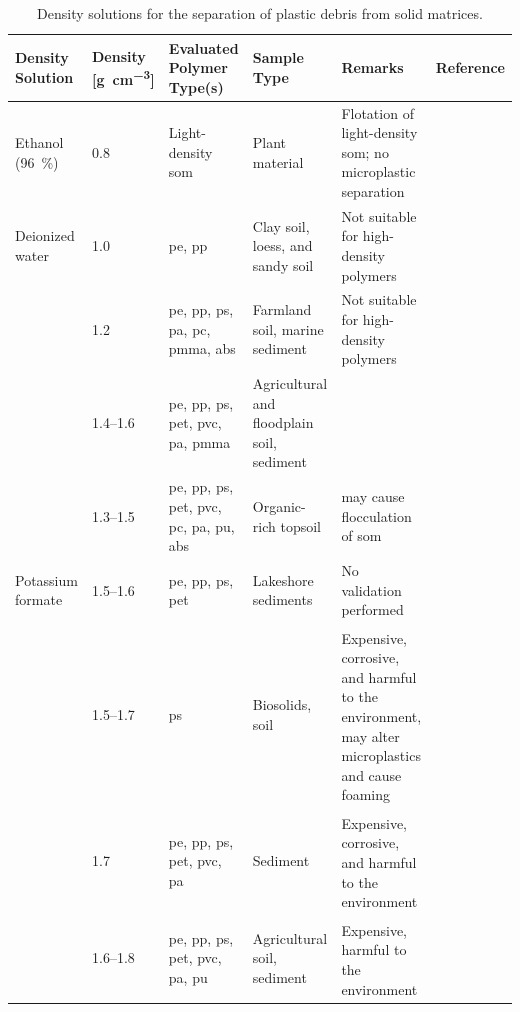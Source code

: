 \begin{table}[t]
	\centering\footnotesize
	\caption{Density solutions for the separation of plastic debris from solid matrices.}\label{tab:density-solutions}
	\begin{tabulary}{1.0\textwidth}{LLLLLL}
			\toprule
			{Density Solution} & {Density [\si{\gram\per\cubic\centi\meter}]} & {Evaluated Polymer Type(s)} & {Sample Type} & {Remarks} & {Reference} \\
			\midrule
			Ethanol (\SI{96}{\percent}) & \num{0.8} & Light-density \acs{som} & Plant material & Flotation of light-density \acs{som}; no microplastic separation & \citet{HerreraNovel2018} \\
			Deionized water & \num{1.0} & \acs{pe}, \acs{pp} & Clay soil, loess, and sandy soil & Not suitable for high-density polymers & \citet{ZhangSimple2018} \\
			 & \num{1.2} & \acs{pe}, \acs{pp}, \acs{ps}, \acs{pa}, \acs{pc}, \acs{pmma}, \acs{abs} & Farmland soil, marine sediment & Not suitable for high-density polymers & \citet{LiuMicroplastic2018,NuelleNew2014} \\
			 & \numrange{1.4}{1.6} & \acs{pe}, \acs{pp}, \acs{ps}, \acs{pet}, \acs{pvc}, \acs{pa}, \acs{pmma} & Agricultural and floodplain soil, sediment &  & \citet{LiuMethod2019,QuinnValidation2017} \\
			 & \numrange{1.3}{1.5} & \acs{pe}, \acs{pp}, \acs{ps}, \acs{pet}, \acs{pvc}, \acs{pc}, \acs{pa}, \acs{pu}, \acs{abs} & Organic-rich topsoil &  may cause flocculation of \acs{som} & \citet{ScheurerMicroplastics2018} \\
			Potassium formate & \numrange{1.5}{1.6} & \acs{pe}, \acs{pp}, \acs{ps}, \acs{pet} & Lakeshore sediments & No validation performed & \citet{XiongSources2018} \\
			 & \numrange{1.5}{1.7} & \acs{ps} & Biosolids, soil & Expensive\textsuperscript{\textdagger}, corrosive, and harmful to the environment, may alter microplastics and cause foaming & \citet{WangPoor2018} \\
			 & \num{1.7} & \acs{pe}, \acs{pp}, \acs{ps}, \acs{pet}, \acs{pvc}, \acs{pa} & Sediment & Expensive\textsuperscript{\textdagger}, corrosive, and harmful to the environment & \citet{QuinnValidation2017} \\
			 & \numrange{1.6}{1.8} & \acs{pe}, \acs{pp}, \acs{ps}, \acs{pet}, \acs{pvc}, \acs{pa}, \acs{pu} & Agricultural soil, sediment & Expensive\textsuperscript{\textdagger}, harmful to the environment & \citet{ClaessensNew2013,QuinnValidation2017,NuelleNew2014,HuangAgricultural2020} \\

\end{tabulary}
\end{table}
